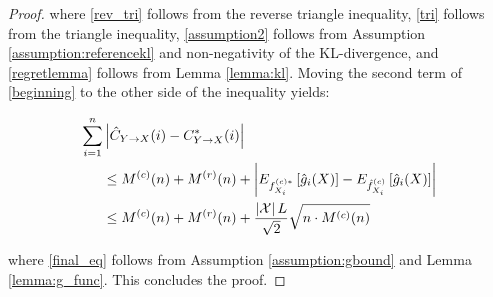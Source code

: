 \begin{proof}
\noindent where \eqref{rev_tri} follows from the reverse triangle inequality, \eqref{tri} follows from the triangle inequality, \eqref{assumption2} follows from Assumption \ref{assumption:referencekl} and non-negativity of the KL-divergence, and \eqref{regretlemma} follows from Lemma \ref{lemma:kl}. Moving the second term of \eqref{beginning} to the other side of the inequality yields:

\begin{align}
\sum_{i=1}^n & \left| \estcyx(i) - \optcyx(i) \right| \nonumber \\
& \le M^{(c)}(n) + M^{(r)}(n) + \left|
E_{\optfxc{i}}\left[ \hat{g}_i(X)\right] -
E_{\estfxc{i}}\left[ \hat{g}_i(X)\right]
\right| \nonumber \\
& \le M^{(c)}(n) + M^{(r)}(n) +
\frac{\left|\mc{X}\right|L}{\sqrt{2}}\sqrt{n \cdot M^{(c)}(n)}
\label{final_eq}
\end{align}

\noindent where \eqref{final_eq} follows from Assumption \ref{assumption:gbound} and Lemma \ref{lemma:g_func}. This concludes the proof.

\end{proof}